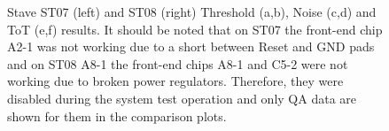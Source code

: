 \begin{figure}
        \null \hfill
        \hfill
       \hfill \null   
        \caption{Stave ST07 (left) and ST08 (right) Threshold (a,b), Noise (c,d)  and ToT (e,f) results. It should be noted that on ST07 the front-end chip A2-1 was not working due to a short between Reset and GND pads and on ST08 A8-1 the front-end chips A8-1 and C5-2 were not working due to broken power regulators. Therefore, they were disabled during the system test operation and only QA data are shown for them in the comparison plots. }
\end{figure}

%        

